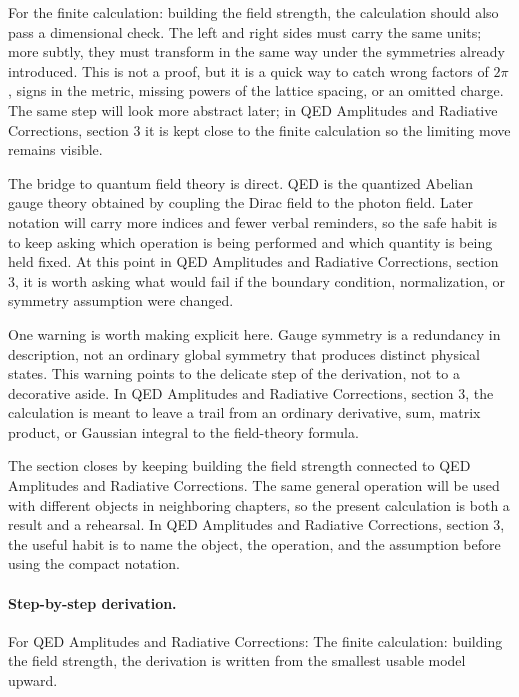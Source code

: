 For the finite calculation: building the field strength, the calculation should also pass a dimensional check.  The left and right sides must carry the same units; more subtly, they must transform in the same way under the symmetries already introduced.  This is not a proof, but it is a quick way to catch wrong factors of \(2\pi\), signs in the metric, missing powers of the lattice spacing, or an omitted charge.  The same step will look more abstract later; in QED Amplitudes and Radiative Corrections, section 3 it is kept close to the finite calculation so the limiting move remains visible.

The bridge to quantum field theory is direct.  QED is the quantized Abelian gauge theory obtained by coupling the Dirac field to the photon field.  Later notation will carry more indices and fewer verbal reminders, so the safe habit is to keep asking which operation is being performed and which quantity is being held fixed.  At this point in QED Amplitudes and Radiative Corrections, section 3, it is worth asking what would fail if the boundary condition, normalization, or symmetry assumption were changed.

One warning is worth making explicit here.  Gauge symmetry is a redundancy in description, not an ordinary global symmetry that produces distinct physical states.  This warning points to the delicate step of the derivation, not to a decorative aside.  In QED Amplitudes and Radiative Corrections, section 3, the calculation is meant to leave a trail from an ordinary derivative, sum, matrix product, or Gaussian integral to the field-theory formula.

The section closes by keeping building the field strength connected to QED Amplitudes and Radiative Corrections.  The same general operation will be used with different objects in neighboring chapters, so the present calculation is both a result and a rehearsal.  In QED Amplitudes and Radiative Corrections, section 3, the useful habit is to name the object, the operation, and the assumption before using the compact notation.



\paragraph{Step-by-step derivation.}

For QED Amplitudes and Radiative Corrections: The finite calculation: building the field strength, the derivation is written from the smallest usable model upward.

